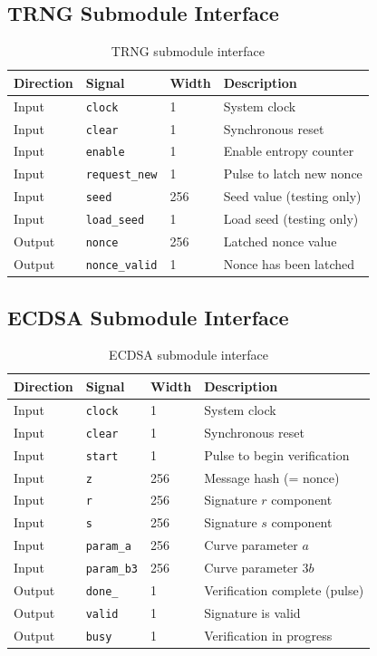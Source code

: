 \documentclass[11pt]{article}
\begin{document}
\subsection{TRNG Submodule Interface}

\begin{table}[h]
\centering
\begin{tabular}{@{}lllp{6cm}@{}}
\toprule
\textbf{Direction} & \textbf{Signal} & \textbf{Width} & \textbf{Description} \\
\midrule
Input & \texttt{clock} & 1 & System clock \\
Input & \texttt{clear} & 1 & Synchronous reset \\
Input & \texttt{enable} & 1 & Enable entropy counter \\
Input & \texttt{request\_new} & 1 & Pulse to latch new nonce \\
Input & \texttt{seed} & 256 & Seed value (testing only) \\
Input & \texttt{load\_seed} & 1 & Load seed (testing only) \\
\midrule
Output & \texttt{nonce} & 256 & Latched nonce value \\
Output & \texttt{nonce\_valid} & 1 & Nonce has been latched \\
\bottomrule
\end{tabular}
\caption{TRNG submodule interface}
\end{table}

\subsection{ECDSA Submodule Interface}

\begin{table}[h]
\centering
\begin{tabular}{@{}lllp{6cm}@{}}
\toprule
\textbf{Direction} & \textbf{Signal} & \textbf{Width} & \textbf{Description} \\
\midrule
Input & \texttt{clock} & 1 & System clock \\
Input & \texttt{clear} & 1 & Synchronous reset \\
Input & \texttt{start} & 1 & Pulse to begin verification \\
Input & \texttt{z} & 256 & Message hash (= nonce) \\
Input & \texttt{r} & 256 & Signature $r$ component \\
Input & \texttt{s} & 256 & Signature $s$ component \\
Input & \texttt{param\_a} & 256 & Curve parameter $a$ \\
Input & \texttt{param\_b3} & 256 & Curve parameter $3b$ \\
\midrule
Output & \texttt{done\_} & 1 & Verification complete (pulse) \\
Output & \texttt{valid} & 1 & Signature is valid \\
Output & \texttt{busy} & 1 & Verification in progress \\
\bottomrule
\end{tabular}
\caption{ECDSA submodule interface}
\end{table}
\end{document}
